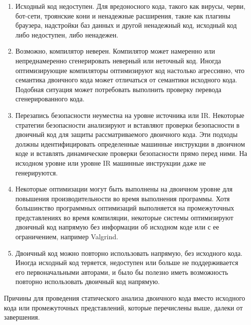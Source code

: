 \begin{enumerate}
        \item Исходный код недоступен. Для вредоносного кода, такого как вирусы, черви, бот-сети, троянские кони и 
            ненадежные расширения, такие как плагины браузера, надстройки баз данных и другой ненадежный код, исходный код 
            либо недоступен, либо ненадежен. 
        \item Возможно, компилятор неверен. Компилятор может намеренно или непреднамеренно сгенерировать неверный или 
            неточный код. Иногда оптимизирующие компиляторы оптимизируют код настолько агрессивно, что семантика двоичного 
            кода может отличаться от семантики исходного кода. Подобная ситуация может потребовать выполнить проверку 
            перевода сгенерированного кода.
        \item Перезапись безопасности неуместна на уровне источника или IR. Некоторые стратегии безопасности анализируют и 
            вставляют проверки безопасности в двоичный код для защиты рассматриваемого двоичного кода. Эти подходы должны 
            идентифицировать определенные машинные инструкции в двоичном коде и вставлять динамические проверки 
            безопасности прямо перед ними. На исходном уровне или уровне IR машинные инструкции даже не генерируются.
        \item Некоторые оптимизации могут быть выполнены на двоичном уровне для повышения производительности во время  
            выполнения программы. Хотя большинство программных оптимизаций выполняется на промежуточных представлениях во 
            время компиляции, некоторые системы оптимизируют двоичный код напрямую без информации об исходном коде или с  
            ее ограничением, например Valgrind\cite{}.
        \item Двоичный код можно повторно использовать напрямую, без исходного кода. Иногда исходный код теряется, 
            недоступен или больше не поддерживается его первоначальными авторами, и было бы полезно иметь возможность 
            повторно использовать двоичный код напрямую.
\end{enumerate}

Причины для проведения статического анализа двоичного кода вместо исходного кода или промежуточных представлений, которые 
перечислены выше, далеки от завершения.

